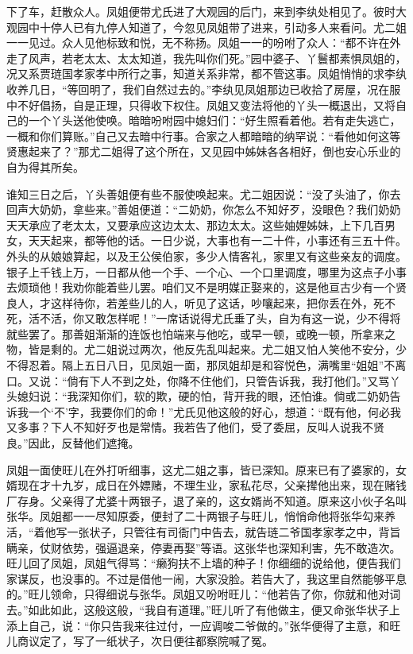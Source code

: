 \documentclass[12pt,oneside]{book}
\begin{document}
下了车，赶散众人。凤姐便带尤氏进了大观园的后门，来到李纨处相见了。彼时大观园中十停人已有九停人知道了，今忽见凤姐带了进来，引动多人来看问。尤二姐一一见过。众人见他标致和悦，无不称扬。凤姐一一的吩咐了众人：“都不许在外走了风声，若老太太、太太知道，我先叫你们死。”园中婆子、丫鬟都素惧凤姐的，况又系贾琏国孝家孝中所行之事，知道关系非常，都不管这事。凤姐悄悄的求李纨收养几日，“等回明了，我们自然过去的。”李纨见凤姐那边已收拾了房屋，况在服中不好倡扬，自是正理，只得收下权住。凤姐又变法将他的丫头一概退出，又将自己的一个丫头送他使唤。暗暗吩咐园中媳妇们：“好生照看着他。若有走失逃亡，一概和你们算账。”自己又去暗中行事。合家之人都暗暗的纳罕说：“看他如何这等贤惠起来了？”那尤二姐得了这个所在，又见园中姊妹各各相好，倒也安心乐业的自为得其所矣。

谁知三日之后，丫头善姐便有些不服使唤起来。尤二姐因说：“没了头油了，你去回声大奶奶，拿些来。”善姐便道：“二奶奶，你怎么不知好歹，没眼色？我们奶奶天天承应了老太太，又要承应这边太太、那边太太。这些妯娌姊妹，上下几百男女，天天起来，都等他的话。一日少说，大事也有一二十件，小事还有三五十件。外头的从娘娘算起，以及王公侯伯家，多少人情客礼，家里又有这些亲友的调度。银子上千钱上万，一日都从他一个手、一个心、一个口里调度，哪里为这点子小事去烦琐他！我劝你能着些儿罢。咱们又不是明媒正娶来的，这是他亘古少有一个贤良人，才这样待你，若差些儿的人，听见了这话，吵嚷起来，把你丢在外，死不死，活不活，你又敢怎样呢！”一席话说得尤氏垂了头，自为有这一说，少不得将就些罢了。那善姐渐渐的连饭也怕端来与他吃，或早一顿，或晚一顿，所拿来之物，皆是剩的。尤二姐说过两次，他反先乱叫起来。尤二姐又怕人笑他不安分，少不得忍着。隔上五日八日，见凤姐一面，那凤姐却是和容悦色，满嘴里“姐姐”不离口。又说：“倘有下人不到之处，你降不住他们，只管告诉我，我打他们。”又骂丫头媳妇说：“我深知你们，软的欺，硬的怕，背开我的眼，还怕谁。倘或二奶奶告诉我一个‘不’字，我要你们的命！”尤氏见他这般的好心，想道：“既有他，何必我又多事？下人不知好歹也是常情。我若告了他们，受了委屈，反叫人说我不贤良。”因此，反替他们遮掩。

凤姐一面使旺儿在外打听细事，这尤二姐之事，皆已深知。原来已有了婆家的，女婿现在才十九岁，成日在外嫖赌，不理生业，家私花尽，父亲撵他出来，现在赌钱厂存身。父亲得了尤婆十两银子，退了亲的，这女婿尚不知道。原来这小伙子名叫张华。凤姐都一一尽知原委，便封了二十两银子与旺儿，悄悄命他将张华勾来养活，“着他写一张状子，只管往有司衙门中告去，就告琏二爷国孝家孝之中，背旨瞒亲，仗财依势，强逼退亲，停妻再娶”等语。这张华也深知利害，先不敢造次。旺儿回了凤姐，凤姐气得骂：“癞狗扶不上墙的种子！你细细的说给他，便告我们家谋反，也没事的。不过是借他一闹，大家没脸。若告大了，我这里自然能够平息的。”旺儿领命，只得细说与张华。凤姐又吩咐旺儿：“他若告了你，你就和他对词去。”如此如此，这般这般，“我自有道理。”旺儿听了有他做主，便又命张华状子上添上自己，说：“你只告我来往过付，一应调唆二爷做的。”张华便得了主意，和旺儿商议定了，写了一纸状子，次日便往都察院喊了冤。
\end{document}
